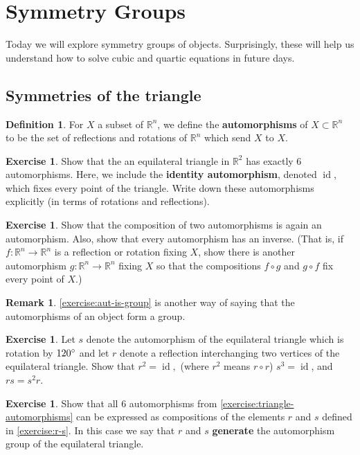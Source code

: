 \documentclass[reqno, 12pt, letter]{article}
\theoremstyle{plain}
\theoremstyle{definition}
\newtheorem{definition}[theorem]{Definition}
\newtheorem{remark}[theorem]{Remark}
\newtheorem{exercise}[theorem]{Exercise}
\theoremstyle{remark}
\numberwithin{equation}{section}
\newcommand\br{{\mathbb R}}
\newcommand \ra{\rightarrow}
\DeclareMathOperator\id{id}
\begin{document}
\newpage
\section{Symmetry Groups}

Today we will explore symmetry groups of objects. Surprisingly, these will help us understand
how to solve cubic and quartic equations in future days.

\subsection{Symmetries of the triangle}

\begin{definition}
	\label{definition:automorphisms}
	For $X$ a subset of $\br^n$, we define the {\bf automorphisms} of $X \subset \br^n$ to be the set of
	reflections and rotations of $\br^n$ which send $X$ to $X$.
\end{definition}

\begin{exercise}
	\label{exercise:triangle-automorphisms}
	Show that the an equilateral triangle in $\br^2$ has exactly $6$ automorphisms.
	Here, we include the {\bf identity automorphism}, denoted $\id$, which fixes every point of the triangle.
	Write down these automorphisms explicitly (in terms of rotations and reflections).
\end{exercise}
\begin{exercise}
	\label{exercise:aut-is-group}
	Show that the composition of two automorphisms is again an automorphism.
	Also, show that every automorphism has an inverse. (That is, if $f: \br^n \ra \br^n$ is a reflection or rotation fixing $X$, show there is
	another automorphism $g: \br^n \ra \br^n$ fixing $X$ so that the compositions $f \circ g$ and $g \circ f$ fix every point of $X$.)
\end{exercise}
\begin{remark}
	\label{remark:}
	\autoref{exercise:aut-is-group} is another way of saying that the automorphisms of an object form a group.
\end{remark}
\begin{exercise}
	\label{exercise:r-s}
	Let $s$ denote the automorphism of the equilateral triangle which is rotation by $120\degree$
	and let $r$ denote a reflection interchanging two vertices of the equilateral triangle.
	Show that $r^2= \id,$ (where $r^2$ means $r \circ r$) $s^3 = \id$, and $rs = s^2r$.
\end{exercise}
\begin{exercise}
	\label{exercise:}
	Show that all $6$ automorphisms from \autoref{exercise:triangle-automorphisms} can be expressed as compositions
	of the elements $r$ and $s$ defined in \autoref{exercise:r-s}. In this case we say that $r$ and $s$ {\bf generate}
	the automorphism group of the equilateral triangle.
\end{exercise}
\end{document}
